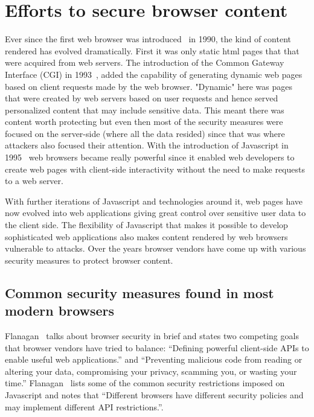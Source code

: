\section{Efforts to secure browser content}
Ever since the first web browser was introduced~\cite{nexus} in 1990, the kind of
content rendered has evolved dramatically. First it was only static html pages that
that were acquired from web servers. The introduction of the Common Gateway
Interface (CGI) in 1993~\cite{cgi}, added the capability of generating dynamic
web pages based on client requests made by the web browser. "Dynamic" here was
pages that were created by web servers based on user requests and hence served
personalized content that may include sensitive data. This meant there was content
worth protecting but even then most of the security measures were focused
on the server-side (where all the data resided) since that was where attackers
also focused their attention. With the introduction of Javascript in 1995~\cite{js10days}
web browsers became really powerful since it enabled web developers to create web
pages with client-side interactivity without the need to make requests to a web server.

With further iterations of Javascript and technologies around it, web pages have
now evolved into web applications giving great control over sensitive user data to the
client side. The flexibility of Javascript that makes it possible to develop sophisticated
web applications also makes content rendered by web browsers vulnerable to attacks.
Over the years browser vendors have come up with various security measures to
protect browser content.

\subsection{Common security measures found in most modern browsers}
Flanagan~\cite[Section~13.6]{flanagan2011javascript}
talks about browser security in brief and states two competing goals that browser vendors have tried
to balance: ``Defining powerful client-side APIs to enable useful web applications.''
and ``Preventing malicious code from reading or altering your data, compromising
your privacy, scamming you, or wasting your time.'' Flanagan~\cite[Section~13.6.1]{flanagan2011javascript}
lists some of the common security restrictions imposed on Javascript and notes
that ``Different browsers have different security policies and may implement
different API restrictions.''.

